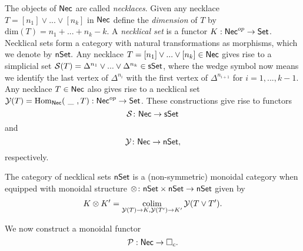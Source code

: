 The objects of $\mathsf{Nec}$ are called \textit{necklaces}. Given any necklace $T=[n_1] \vee ... \vee[n_k]$ in $\mathsf{Nec}$ define the \textit{dimension} of $T$ by $\text{dim}(T)=n_1+ ...+n_k-k$. A \textit{necklical set} is a functor $K: \mathsf{Nec}^{op} \to \mathsf{Set}$. Necklical sets form a category with natural transformations as morphisms, which we denote by $\mathsf{nSet}.$ Any necklace $T=[n_1] \vee ... \vee[n_k] \in \mathsf{Nec}$ gives rise to a simplicial set $\mathcal{S}(T)= \Delta^{n_1} \vee... \vee \Delta^{n_k} \in \mathsf{sSet}$, where the wedge symbol now means we identify the last vertex of $\Delta^{n_i}$ with the first vertex of $\Delta^{n_{i+1}}$ for $i=1,...,k-1$. Any necklace $T \in \mathsf{Nec}$ also gives rise to a necklical set $\mathcal{Y}(T)=\mathrm{Hom}_{\mathsf{Nec}}(\text{ \_ }, T): \mathsf{Nec}^{op} \to \mathsf{Set}$. These constructions give rise to functors 
$$\mathcal{S} \colon \mathsf{Nec} \to \mathsf{sSet}$$
and
$$\mathcal{Y} \colon \mathsf{Nec} \to \mathsf{nSet},$$ respectively. 

The category of necklical sets $\mathsf{nSet}$ is a (non-symmetric) monoidal category when equipped with monoidal structure $\otimes\colon \mathsf{nSet} \times \mathsf{nSet} \to \mathsf{nSet}$ given by $$K \otimes K' = \operatorname*{colim}_{\mathcal{Y}(T) \to K, \mathcal{Y}(T')\to K'} \mathcal{Y}(T \vee T').$$

We now construct a monoidal functor
$$\mathcal{P}: \mathsf{Nec} \to \square_c.$$


